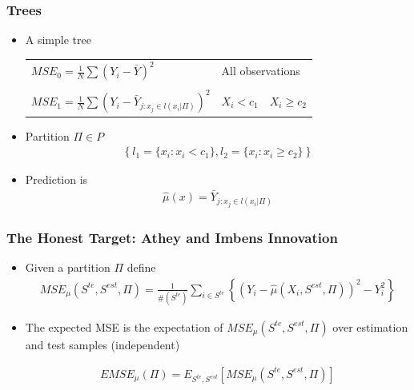 \documentclass[
  shownotes,
  xcolor={svgnames},
  hyperref={colorlinks,citecolor=DarkBlue,linkcolor=DarkRed,urlcolor=DarkBlue}
  , aspectratio=169]{beamer}
\begin{document}
\begin{frame}[fragile]
\frametitle{Trees}
\begin{itemize}
\item A simple tree

\begin{table}[]
\begin{tabular}{lll}
$MSE_0=\frac{1}{N}\sum(Y_i-\bar{Y})^2$ & \multicolumn{2}{l}{All observations} \\
\\
$MSE_1=\frac{1}{N}\sum(Y_i-\bar{Y}_{j:x_j\in l(x_i|\Pi)})^2$   & $X_i < c_1$      & $X_i \geq c_2$    
\end{tabular}
\end{table}
\bigskip
\item Partition $\Pi \in P$
  \begin{align}
  \left\{l_1=\{x_i : x_i< c_1\},l_2=\{x_i : x_i \geq c_2\} \right\}
  \end{align}
\item Prediction is 
  \begin{align}
  \hat{\mu}(x)=\bar{Y}_{j:x_j\in l(x_i|\Pi)}
  \end{align}

\end{itemize}
\end{frame}
\begin{frame}[fragile]
\frametitle{The Honest Target: Athey and Imbens Innovation}

\begin{itemize}
\item Given a partition $\Pi$ define
\begin{align}
MSE_{\mu}(S^{te},S^{est},\Pi)=\frac{1}{\#(S^{te})}\sum_{i\in S^{te}}\left\{ \left(Y_{i}-\hat{\mu}(X_{i},S^{est},\Pi)\right)^{2}-Y_{i}^{2}\right\} 
\end{align}


\bigskip
\item The expected MSE is the expectation of $MSE_{\mu}(S^{te},S^{est},\Pi)$ over estimation and test samples (independent)

\begin{align}
EMSE_{\mu}(\Pi)=E_{S^{te},S^{est}}\left[MSE_{\mu}(S^{te},S^{est},\Pi)\right]
\end{align}


\end{itemize}

\end{frame}
\end{document}
